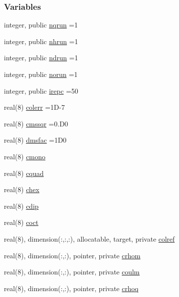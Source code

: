 \subsubsection*{Variables}
\begin{DoxyCompactItemize}
\item 
integer, public \hyperlink{namespacecoulomb_a8f87be32e0e3be0f5c0f72385849bba9}{nqrun} =1
\item 
integer, public \hyperlink{namespacecoulomb_a0a85c519a9c3c83e58ad2fd8b41d63cd}{nhrun} =1
\item 
integer, public \hyperlink{namespacecoulomb_a3a4d72dad873e26eea3e8489927259a8}{ndrun} =1
\item 
integer, public \hyperlink{namespacecoulomb_ac85c91da1536ba35ab613b60649b2c8e}{norun} =1
\item 
integer, public \hyperlink{namespacecoulomb_abbd920ad240f2299a64eb8a558453958}{irepc} =50
\item 
real(8) \hyperlink{namespacecoulomb_ad503a40a54dbeb40ad5ba58cb265828e}{colerr} =1\+D-\/7
\item 
real(8) \hyperlink{namespacecoulomb_a31931c26339890d5d66b1516a05a980a}{cmssqr} =0.\+D0
\item 
real(8) \hyperlink{namespacecoulomb_aa59198776eee2c212c28eff84880b2bb}{dmsfac} =1\+D0
\item 
real(8) \hyperlink{namespacecoulomb_aa87ca99119e06734684a442096f66a9f}{cmono}
\item 
real(8) \hyperlink{namespacecoulomb_a450353dd0725d0adcfccde340eaec3fd}{cquad}
\item 
real(8) \hyperlink{namespacecoulomb_ad110abadb05ffa8e3f56e113982107dd}{chex}
\item 
real(8) \hyperlink{namespacecoulomb_a1f08c19f7be33ad2774d5604183d78ef}{cdip}
\item 
real(8) \hyperlink{namespacecoulomb_ae7bc3b66c52d01cd2a966481a18edceb}{coct}
\item 
real(8), dimension(\+:,\+:,\+:), allocatable, target, private \hyperlink{namespacecoulomb_ad6d5934252662a9fb13323943cd632cf}{colref}
\item 
real(8), dimension(\+:,\+:), pointer, private \hyperlink{namespacecoulomb_aaace1db6c4f56843a8d8e0704b938705}{crhom}
\item 
real(8), dimension(\+:,\+:), pointer, private \hyperlink{namespacecoulomb_ae7ca63e9c625e432df71f2f2bb337039}{coulm}
\item 
real(8), dimension(\+:,\+:), pointer, private \hyperlink{namespacecoulomb_afc907325042890495f83d5596ab1deb7}{crhoq}

\end{DoxyCompactItemize}
